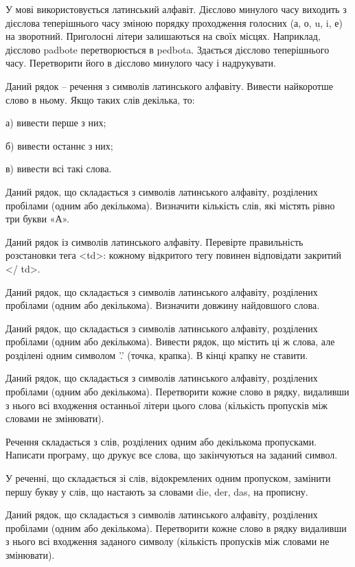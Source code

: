 \documentclass[]{article}
\begin{document}
У мові використовується латинський алфавіт. Дієслово минулого часу
виходить з дієслова теперішнього часу зміною порядку проходження
голосних (а, о, u, i, е) на зворотний. Приголосні літери залишаються на
своїх місцях. Наприклад, дієслово padbote перетворюється в pedbota.
Здається дієслово теперішнього часу. Перетворити його в дієслово
минулого часу і надрукувати.

Даний рядок -- речення з символів латинського алфавіту. Вивести
найкоротше слово в ньому. Якщо таких слів декілька, то:

а) вивести перше з них;

б) вивести останнє з них;

в) вивести всі такі слова.

Даний рядок, що складається з символів латинського алфавіту, розділених
пробілами (одним або декількома). Визначити кількість слів, які містять
рівно три букви «А».

\protect\hypertarget{_Hlk65949143}{}{}Даний рядок із символів
латинського алфавіту. Перевірте правильність розстановки тега
\textless{}td\textgreater{}: кожному відкритого тегу повинен відповідати
закритий \textless{}/ td\textgreater{}.

Даний рядок, що складається з символів латинського алфавіту, розділених
пробілами (одним або декількома). Визначити довжину найдовшого слова.

\protect\hypertarget{_Hlk65949382}{}{}Даний рядок, що складається з
символів латинського алфавіту, розділених пробілами (одним або
декількома). Вивести рядок, що містить ці ж слова, але розділені одним
символом '.' (точка, крапка). В кінці крапку не ставити.

Даний рядок, що складається з символів латинського алфавіту, розділених
пробілами (одним або декількома). Перетворити кожне слово в рядку,
видаливши з нього всі входження останньої літери цього слова (кількість
пропусків між словами не змінювати).

Речення складається з слів, розділених одним або декількома пропусками.
Написати програму, що друкує все слова, що закінчуються на заданий
символ.

\protect\hypertarget{_Hlk65949239}{}{}У реченні, що складається зі слів,
відокремлених одним пропуском, замінити першу букву у слів, що настають
за словами die, der, das, на прописну.

\protect\hypertarget{_Hlk65949422}{}{}Даний рядок, що складається з
символів латинського алфавіту, розділених пробілами (одним або
декількома). Перетворити кожне слово в рядку видаливши з нього всі
входження заданого символу (кількість пропусків між словами не
змінювати).
\end{document}

